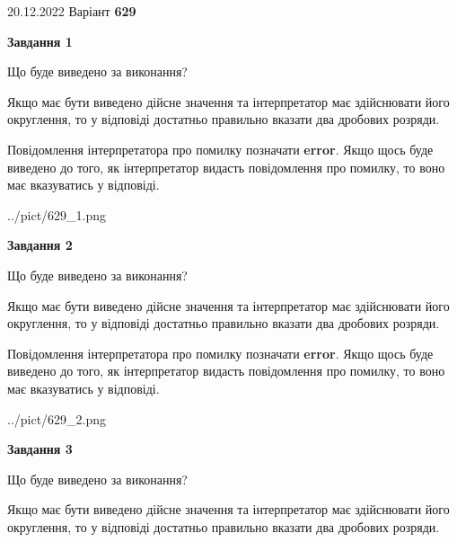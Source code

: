 \documentclass[12pt, ukrainian]{article}
\begin{document}
{20.12.2022 Варіант \No \textbf { 629 }\par}
{
\begin {Large}

{\begin {center}\textbf{Завдання 1}\end {center}}\par
Що буде виведено за виконання? \par

Якщо має бути виведено дійсне значення та інтерпретатор має здійснювати його округлення, 
то у відповіді достатньо правильно вказати два дробових розряди.

Повідомлення інтерпретатора про помилку позначати \textbf{error}.
Якщо щось буде виведено до того, як інтерпретатор видасть повідомлення про помилку, 
то воно має вказуватись у відповіді. \par

\begin{center}
	{../pict/629_1.png}
\end{center}
\newpage

{\begin {center}\textbf{Завдання 2}\end {center}}\par
Що буде виведено за виконання? \par

Якщо має бути виведено дійсне значення та інтерпретатор має здійснювати його округлення, 
то у відповіді достатньо правильно вказати два дробових розряди.

Повідомлення інтерпретатора про помилку позначати \textbf{error}.
Якщо щось буде виведено до того, як інтерпретатор видасть повідомлення про помилку, 
то воно має вказуватись у відповіді. \par

\begin{center}
	{../pict/629_2.png}
\end{center}
\newpage

{\begin {center}\textbf{Завдання 3}\end {center}}\par
Що буде виведено за виконання? \par

Якщо має бути виведено дійсне значення та інтерпретатор має здійснювати його округлення, 
то у відповіді достатньо правильно вказати два дробових розряди.


\end{Large}}
\end{document}
